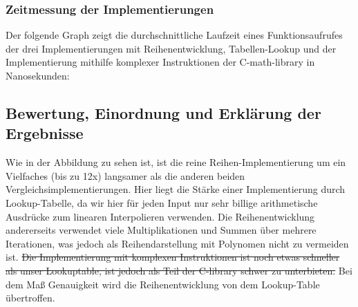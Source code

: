 \documentclass[course=erap] {aspdoc}
\begin{document}
    \subsubsection{Zeitmessung der Implementierungen}

    Der folgende Graph zeigt die durchschnittliche Laufzeit eines Funktionsaufrufes der drei Implementierungen mit Reihenentwicklung, Tabellen-Lookup und der Implementierung mithilfe komplexer Instruktionen der C-math-library in Nanosekunden:


    \subsection{Bewertung, Einordnung und Erklärung der Ergebnisse}
    Wie in der Abbildung zu sehen ist, ist die reine Reihen-Implementierung um ein Vielfaches (bis zu 12x) langsamer als die anderen
    beiden Vergleichsimplementierungen.
    Hier liegt die Stärke einer Implementierung durch Lookup-Tabelle, da wir hier für jeden
    Input nur sehr billige arithmetische Ausdrücke zum linearen Interpolieren verwenden.
    Die Reihenentwicklung andererseits verwendet viele Multiplikationen und Summen über mehrere Iterationen, was jedoch als Reihendarstellung mit Polynomen nicht zu vermeiden ist.
    \sout{Die Implementierung mit komplexen Instruktionen ist noch etwas schneller als unser Lookuptable, ist jedoch als Teil der
    C-library schwer zu unterbieten.} Bei dem Maß Genauigkeit wird die Reihenentwicklung von dem Lookup-Table übertroffen.
\end{document}
